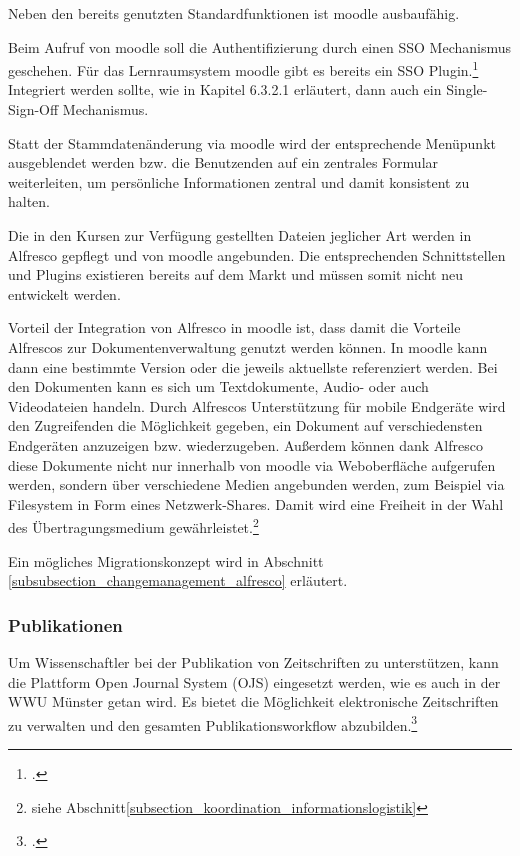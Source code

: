 {{Neben den bereits genutzten Standardfunktionen ist moodle ausbaufähig.

Beim Aufruf von moodle soll die Authentifizierung durch einen SSO Mechanismus geschehen. Für das Lernraumsystem moodle gibt es bereits ein SSO Plugin.\footcite{macklin_moodle_sso_plugin} Integriert werden sollte, wie in Kapitel 6.3.2.1 erläutert, dann auch ein Single-Sign-Off Mechanismus.

Statt der Stammdatenänderung via moodle wird der entsprechende Menüpunkt ausgeblendet werden bzw. die Benutzenden auf ein zentrales Formular weiterleiten, um persönliche Informationen zentral und damit konsistent zu halten.

Die in den Kursen zur Verfügung gestellten Dateien jeglicher Art werden in Alfresco gepflegt und von moodle angebunden. Die entsprechenden Schnittstellen und Plugins existieren bereits auf dem Markt und müssen somit nicht neu entwickelt werden.

Vorteil der Integration von Alfresco in moodle ist, dass damit die Vorteile Alfrescos zur Dokumentenverwaltung genutzt werden können. In moodle kann dann eine bestimmte Version oder die jeweils aktuellste referenziert werden. Bei den Dokumenten kann es sich um Textdokumente, Audio- oder auch Videodateien handeln. Durch Alfrescos Unterstützung für mobile Endgeräte wird den Zugreifenden die Möglichkeit gegeben, ein Dokument auf verschiedensten Endgeräten anzuzeigen bzw. wiederzugeben. Außerdem können dank Alfresco diese Dokumente nicht nur innerhalb von moodle via Weboberfläche aufgerufen werden, sondern über verschiedene Medien angebunden werden, zum Beispiel via Filesystem in Form eines Netzwerk-Shares. 
Damit wird eine Freiheit in der Wahl des Übertragungsmedium gewährleistet.\footnote{siehe Abschnitt\ref{subsection_koordination_informationslogistik}}

Ein mögliches Migrationskonzept wird in Abschnitt \ref{subsubsection_changemanagement_alfresco} erläutert.

\subsubsection{Publikationen}
Um Wissenschaftler bei der Publikation von Zeitschriften zu unterstützen, kann die Plattform Open Journal System (OJS) eingesetzt werden, wie es auch in der WWU Münster getan wird. Es bietet die Möglichkeit elektronische Zeitschriften zu verwalten und den gesamten Publikationsworkflow abzubilden.\footcite[Vgl.][48]{vogl_fortschritte_2012}

}}
